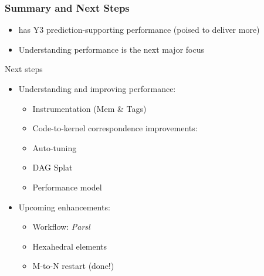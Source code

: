 \begin{frame}\frametitle{Summary and Next Steps}
\begin{itemize}
\item \mirgecom{} has Y3 prediction-supporting performance (poised to deliver more)
\item Understanding \mirgecom{} performance is the next major focus
\end{itemize}
\begin{center}
Next steps
\end{center}
\begin{multicols}{2}
\begin{itemize}
\item Understanding and improving performance:
\begin{itemize}
\item Instrumentation (Mem \& Tags) 
\item Code-to-kernel correspondence improvements: 
\item Auto-tuning 
\item DAG Splat 
\item Performance model
\end{itemize}
\item Upcoming enhancements:
\begin{itemize}
\item Workflow: \textit{Parsl} 
\item Hexahedral elements 
\item M-to-N restart (done!)
\end{itemize}
\end{itemize}
\end{multicols}
\end{frame}


